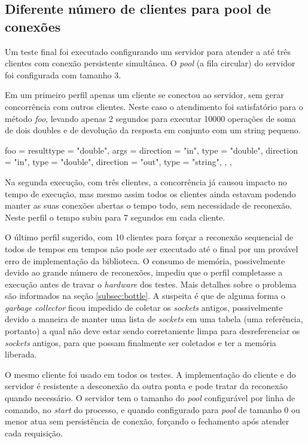 \documentclass[11pt]{article}
\begin{document}
\subsection{Diferente número de clientes para pool de conexões}\label{subsec:diffpool}

Um teste final foi executado configurando um servidor para atender a até três
clientes com conexão persistente simultânea. O \textit{pool} (a fila circular)
do servidor foi configurada com tamanho 3.

Em um primeiro perfil apenas um cliente se conectou ao servidor, sem gerar
concorrência com outros clientes. Neste caso o atendimento foi satisfatório para
o método \textit{foo}, levando apenas 2 segundos para executar 10000 operações
de soma de dois doubles e de devolução da resposta em conjunto com um string
pequeno.

    foo = {
      resulttype = "double",
      args = {
        {direction = "in", type = "double"},
        {direction = "in", type = "double"},
        {direction = "out", type = "string"},
      },
    },

Na segunda execução, com três clientes, a concorrência já causou impacto no
tempo de execução, mas mesmo assim todos os clientes ainda estavam podendo
manter as suas conexões abertas o tempo todo, sem necessidade de reconexão.
Neste perfil o tempo subiu para 7 segundos em cada cliente.

O último perfil sugerido, com 10 clientes para forçar a reconexão sequencial de
todos de tempos em tempos não pode ser executado até o final por um provável
erro de implementação da biblioteca. O consumo de memória, possivelmente devido
ao grande número de reconexões, impediu que o perfil completasse a execução
antes de travar o \textit{hardware} dos testes. Mais detalhes sobre o problema
são informados na seção \ref{subsec:bottle}. A suspeita é que de alguma forma o
\textit{garbage collector} ficou impedido de coletar os \textit{sockets}
antigos, possivelmente devido a maneira de manter uma lista de \textit{sockets}
em uma tabela (uma referência, portanto) a qual não deve estar sendo
corretamente limpa para desreferenciar os \textit{sockets} antigos, para que
possam finalmente ser coletados e ter a memória liberada.

O mesmo cliente foi usado em todos os testes. A implementação do cliente e do
servidor é resistente a desconexão da outra ponta e pode tratar da reconexão
quando necessário. O servidor tem o tamanho do \textit{pool} configurável por
linha de comando, no \textit{start} do processo, e quando configurado para
\textit{pool} de tamanho 0 ou menor atua sem persistência de conexão, forçando o
fechamento após atender cada requisição.
\end{document}
